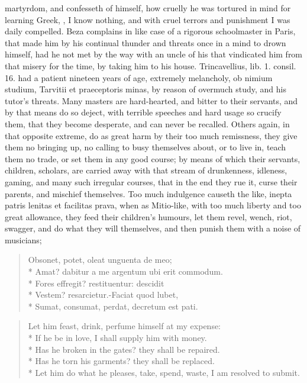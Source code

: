 {martyrdom, and confesseth of himself, how cruelly he was tortured in
mind for learning Greek, , I know nothing, and with
cruel terrors and punishment I was daily compelled. Beza
complains in like case of a rigorous schoolmaster in Paris, that made
him by his continual thunder and threats once in a mind to drown
himself, had he not met by the way with an uncle of his that vindicated
him from that misery for the time, by taking him to his house.
Trincavellius, lib. 1. consil. 16. had a patient nineteen years of age,
extremely melancholy, ob nimium studium, Tarvitii et praeceptoris
minas, by reason of overmuch study, and his tutor's threats. Many
masters are hard-hearted, and bitter to their servants, and by that
means do so deject, with terrible speeches and hard usage so crucify
them, that they become desperate, and can never be recalled.
Others again, in that opposite extreme, do as great harm by their too
much remissness, they give them no bringing up, no calling to busy
themselves about, or to live in, teach them no trade, or set them in
any good course; by means of which their servants, children, scholars,
are carried away with that stream of drunkenness, idleness, gaming, and
many such irregular courses, that in the end they rue it, curse their
parents, and mischief themselves. Too much indulgence causeth the like,
inepta patris lenitas et facilitas prava, when as Mitio-like,
with too much liberty and too great allowance, they feed their
children's humours, let them revel, wench, riot, swagger, and do what
they will themselves, and then punish them with a noise of musicians;
%
\begin{latin}
\begin{verse}
Obsonet, potet, oleat unguenta de meo;\\*
Amat? dabitur a me argentum ubi erit commodum.\\*
Fores effregit? restituentur: descidit\\*
Vestem? resarcietur.-Faciat quod lubet,\\*
Sumat, consumat, perdat, decretum est pati.
\end{verse}
\end{latin}
\translationrule
\begin{verse}
Let him feast, drink, perfume himself at my expense:\\*
If he be in love, I shall supply him with money.\\*
Has he broken in the gates? they shall be repaired.\\*
Has he torn his garments? they shall be replaced.\\*
Let him do what he pleases, take, spend, waste, I am resolved to submit.
\end{verse}

}
